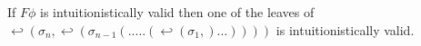 \documentclass[runningheads]{llncs}
\begin{document}




\begin{theorem}
    If $F\phi$ is intuitionistically valid then one of the leaves of $ \hookleftarrow (\sigma_n,\hookleftarrow(\sigma_{n-1}(.....(\hookleftarrow(\sigma_1 , )...)))) $ is intuitionistically valid.
\end{theorem}
\end{document}
